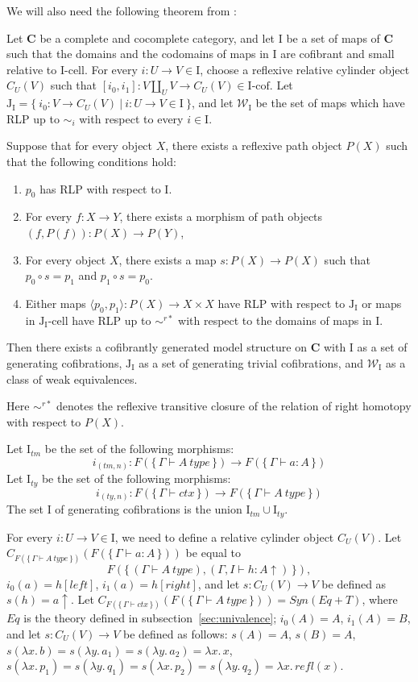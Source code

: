 \documentclass{mscs}
\newcommand{\cat}[1]{\mathbf{#1}}
\newcommand{\C}{\cat{C}}
\newcommand{\we}{\mathcal{W}}
\newcommand{\I}{\mathrm{I}}
\newcommand{\J}{\mathrm{J}}
\newcommand{\class}[2]{#1\text{-}\mathrm{#2}}
\newcommand{\Icell}[1][\I]{\class{#1}{cell}}
\newcommand{\Icof}[1][\I]{\class{#1}{cof}}
\newcommand{\Jcell}[1][]{\Icell[\J#1]}
\newcommand{\cyli}{i}
\numberwithin{figure}{section}
\begin{document}
We will also need the following theorem from \cite{f-model-structures}:
\begin{thm}
Let $\C$ be a complete and cocomplete category, and let $\I$ be a set of maps of $\C$
such that the domains and the codomains of maps in $\I$ are cofibrant and small relative to $\Icell$.
For every $i : U \to V \in \I$, choose a reflexive relative cylinder object $C_U(V)$
such that $[\cyli_0,\cyli_1] : V \amalg_U V \to C_U(V) \in \Icof$.
Let $\J_\I = \{\ \cyli_0 : V \to C_U(V)\ |\ i : U \to V \in \I \ \}$, and
let $\we_\I$ be the set of maps which have RLP up to $\sim_i$ with respect to every $i \in \I$.

Suppose that for every object $X$, there exists a reflexive path object $P(X)$ such that the following conditions hold:
\begin{enumerate}
\item $p_0$ has RLP with respect to $\I$.
\item For every $f : X \to Y$, there exists a morphism of path objects $(f,P(f)) : P(X) \to P(Y)$,
\item For every object $X$, there exists a map $s : P(X) \to P(X)$ such that $p_0 \circ s = p_1$ and $p_1 \circ s = p_0$.
\item Either maps $\langle p_0, p_1 \rangle : P(X) \to X \times X$ have RLP with respect to $\J_\I$
or maps in $\Jcell[_\I]$ have RLP up to $\sim^{r*}$ with respect to the domains of maps in $\I$.
\end{enumerate}
Then there exists a cofibrantly generated model structure on $\C$ with $\I$ as a set of generating cofibrations,
$\J_\I$ as a set of generating trivial cofibrations, and $\we_\I$ as a class of weak equivalences.
\end{thm}
Here $\sim^{r*}$ denotes the reflexive transitive closure of the relation of right homotopy with respect to $P(X)$.

Let $\I_{tm}$ be the set of the following morphisms:
\[ i_{(tm,n)} : F(\{\,\Gamma \vdash A\ type\,\}) \to F(\{\,\Gamma \vdash a : A\,\}) \]
Let $\I_{ty}$ be the set of the following morphisms:
\[ i_{(ty,n)} : F(\{\,\Gamma \vdash ctx\,\}) \to F(\{\,\Gamma \vdash A\ type\,\}) \]
The set $\I$ of generating cofibrations is the union $\I_{tm} \cup \I_{ty}$.

For every $i : U \to V \in \I$, we need to define a relative cylinder object $C_U(V)$.
Let $C_{F(\{\,\Gamma \vdash A\ type\,\})}(F(\{\,\Gamma \vdash a : A\,\}))$ be equal to
\[ F(\{\,(\Gamma \vdash A\ type), (\Gamma, I \vdash h : A\!\uparrow)\,\}), \]
$\cyli_0(a) = h[left]$, $\cyli_1(a) = h[right]$, and let $s : C_U(V) \to V$ be defined as $s(h) = a\!\uparrow$.
Let $C_{F(\{\,\Gamma \vdash ctx\,\})}(F(\{\,\Gamma \vdash A\ type\,\})) = Syn(Eq + T)$, where $Eq$ is the theory defined in subsection~\ref{sec:univalence};
$\cyli_0(A) = A$, $\cyli_1(A) = B$, and let $s : C_U(V) \to V$ be defined as follows:
$s(A) = A$, $s(B) = A$, $s(\lambda x.\,b) = s(\lambda y.\,a_1) = s(\lambda y.\,a_2) = \lambda x.\,x$,
$s(\lambda x.\,p_1) = s(\lambda y.\,q_1) = s(\lambda x.\,p_2) = s(\lambda y.\,q_2) = \lambda x.\,refl(x)$.
\end{document}
